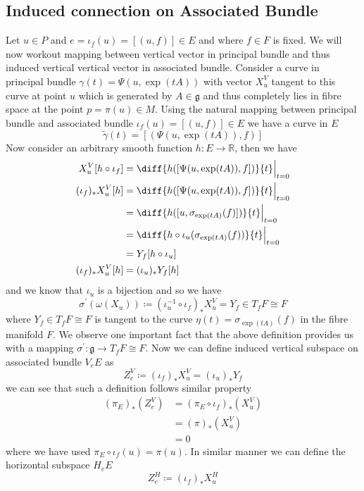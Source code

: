 \documentclass[12pt]{article}
\begin{document}
\subsection{Induced connection on Associated Bundle}
Let $u\in P$ and $e = \iota_{f}(u) = [(u, f)]\in E$ and where $f\in F$ is fixed. We will now workout mapping between vertical vector in principal bundle and thus induced vertical vertical vector in associated bundle. Consider a curve in principal bundle $\gamma(t) = \Psi(u, \exp(tA))$ with vector $X^{V}_{u}$ tangent to this curve at point $u$ which is generated by $A\in\mathfrak{g}$ and thus completely lies in fibre space at the point $p = \pi(u)\in M$. Using the natural mapping between principal bundle and associated bundle $\iota_{f}(u) = [(u, f)]\in E$ we have a curve in $E$
\begin{equation*}
    \tilde{\gamma}(t) = [(\Psi(u, \exp(tA)), f)]
\end{equation*}Now consider an arbitrary smooth function $h\colon E\to \mathbb{R}$, then we have
\begin{align*}
    X^{V}_{u}[h\circ\iota_{f}] &= \diff{h([\Psi(u, \exp(tA)), f])}{t}\Bigr|_{t=0} \\
    (\iota_{f})_{\ast}X^{V}_{u}[h] &= \diff{h([\Psi(u, \exp(tA)), f])}{t}\Bigr|_{t=0} \\
                                   &= \diff{h([u, \sigma_{\exp(tA)}(f)])}{t}\Bigr|_{t=0} \\
                                   &= \diff{h\circ\iota_{u}(\sigma_{\exp(tA)}(f))}{t}\Bigr|_{t=0} \\
                                   &= Y_{f}[h\circ\iota_{u}] \\
   (\iota_{f})_{\ast}X^{V}_{u}[h]  &= (\iota_{u})_{\ast}Y_{f}[h]
\end{align*} and we know that $\iota_{u}$ is a bijection and so we have
\begin{equation*}\label{eq:7}
    \sigma^{\prime}(\omega(X_{u}))\coloneqq(\iota_{u}^{-1}\circ\iota_{f})_{\ast}X^{V}_{u} = Y_{f}\in T_{f}F\cong F
\end{equation*} where $Y_{f}\in T_{f}F\cong F$ is tangent to the curve $\eta(t) = \sigma_{\exp(tA)}(f)$ in the fibre manifold $F$. We observe one important fact that the above definition provides us with a mapping $\sigma^{\prime}\colon\mathfrak{g}\to T_{f}F\cong F$. Now we can define induced vertical subspace on associated bundle $V_{e}E$ as
\begin{equation*}
    Z^{V}_{e} \coloneqq (\iota_{f})_{\ast}X^{V}_{u} = (\iota_{u})_{\ast}Y_{f}
\end{equation*} we can see that such a definition follows similar property
\begin{align*}
    (\pi_{E})_{\ast}(Z^{V}_{e}) &= (\pi_{E}\circ\iota_{f})_{\ast}(X^{V}_{u}) \\
                                &= (\pi)_{\ast}(X^{V}_{u}) \\
                                &= 0
\end{align*} where we have used $\pi_{E}\circ\iota_{f}(u) = \pi(u)$. In similar manner we can define the horizontal subspace $H_{e}E$
\begin{equation*}
    Z^{H}_{e} \coloneqq (\iota_{f})_{\ast}X^{H}_{u}
\end{equation*}
\end{document}
